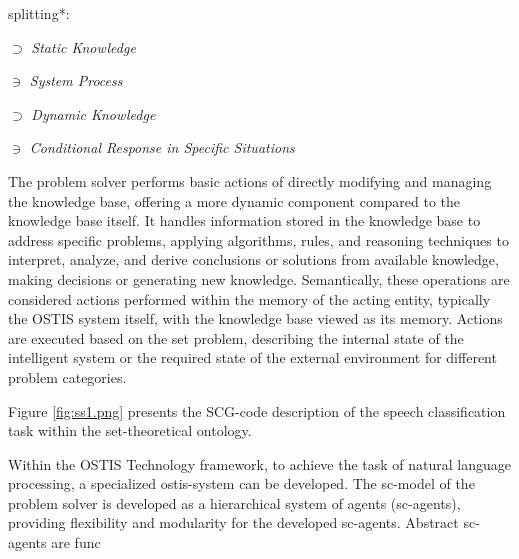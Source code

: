 \documentclass[10pt, a4paper]{article}
\begin{document}
\begin{SCn}
\begin{small}
\begin{multicols}{2}
\hspace{1.2cm}  \begin{scnrelfromset} {splitting*:}
\vspace{-0.3cm}
 \end{scnrelfromset}
\hspace{0.6cm} $\supset$ \hspace{0.3cm} \textit { Static Knowledge}\par
\hspace{1cm} $\ni$ \hspace{0.3cm} \textit {System Process}\par
\hspace{0.6cm} $\supset$ \hspace{0.3cm} \textit {Dynamic Knowledge}\par
\hspace{1cm} $\ni$ \hspace{0.3cm} \textit {Conditional Response in Specific Situations} \par
\vspace{0.2cm}
The problem solver performs basic actions of directly
modifying and managing the knowledge base, offering
a more dynamic component compared to the knowledge
base itself. It handles information stored in the knowledge
base to address specific problems, applying algorithms,
rules, and reasoning techniques to interpret, analyze, and
derive conclusions or solutions from available knowledge,
making decisions or generating new knowledge. Semantically, these operations are considered actions performed
within the memory of the acting entity, typically the
OSTIS system itself, with the knowledge base viewed
as its memory. Actions are executed based on the set
problem, describing the internal state of the intelligent
system or the required state of the external environment
for different problem categories.\par
Figure  \ref{fig:ss1.png} presents the SCG-code description of the
speech classification task within the set-theoretical ontology.\par
Within the OSTIS Technology framework, to achieve
the task of natural language processing, a specialized
ostis-system can be developed. The sc-model of the
problem solver is developed as a hierarchical system of
agents (sc-agents), providing flexibility and modularity
for the developed sc-agents. Abstract sc-agents are func
\end{multicols}

\end{small}
\end{SCn}
\end{document}
